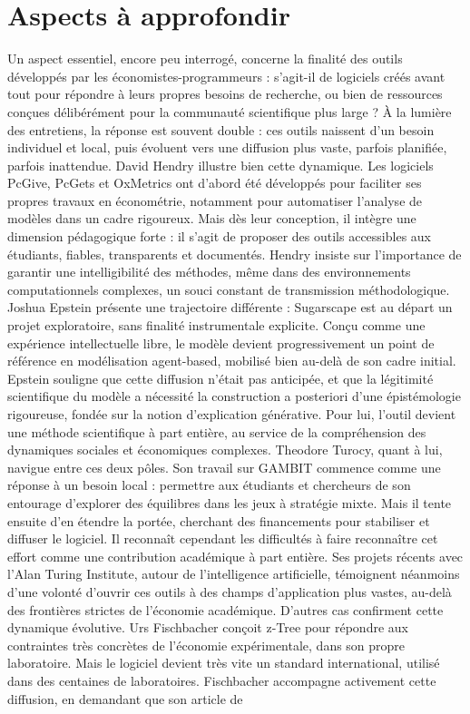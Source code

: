 \section{Aspects à approfondir}

Un aspect essentiel, encore peu interrogé, concerne la finalité des outils développés par les économistes-programmeurs : s’agit-il de logiciels créés avant tout pour répondre à leurs propres besoins de recherche, ou bien de ressources conçues délibérément pour la communauté scientifique plus large ? À la lumière des entretiens, la réponse est souvent double : ces outils naissent d’un besoin individuel et local, puis évoluent vers une diffusion plus vaste, parfois planifiée, parfois inattendue. David Hendry illustre bien cette dynamique. Les logiciels PcGive, PcGets et OxMetrics ont d’abord été développés pour faciliter ses propres travaux en économétrie, notamment pour automatiser l’analyse de modèles dans un cadre rigoureux. Mais dès leur conception, il intègre une dimension pédagogique forte : il s’agit de proposer des outils accessibles aux étudiants, fiables, transparents et documentés. Hendry insiste sur l’importance de garantir une intelligibilité des méthodes, même dans des environnements computationnels complexes, un souci constant de transmission méthodologique. Joshua Epstein présente une trajectoire différente : Sugarscape est au départ un projet exploratoire, sans finalité instrumentale explicite. Conçu comme une expérience intellectuelle libre, le modèle devient progressivement un point de référence en modélisation agent-based, mobilisé bien au-delà de son cadre initial. Epstein souligne que cette diffusion n’était pas anticipée, et que la légitimité scientifique du modèle a nécessité la construction a posteriori d’une épistémologie rigoureuse, fondée sur la notion d’explication générative. Pour lui, l’outil devient une méthode scientifique à part entière, au service de la compréhension des dynamiques sociales et économiques complexes. Theodore Turocy, quant à lui, navigue entre ces deux pôles. Son travail sur GAMBIT commence comme une réponse à un besoin local : permettre aux étudiants et chercheurs de son entourage d’explorer des équilibres dans les jeux à stratégie mixte. Mais il tente ensuite d’en étendre la portée, cherchant des financements pour stabiliser et diffuser le logiciel. Il reconnaît cependant les difficultés à faire reconnaître cet effort comme une contribution académique à part entière. Ses projets récents avec l’Alan Turing Institute, autour de l’intelligence artificielle, témoignent néanmoins d’une volonté d’ouvrir ces outils à des champs d’application plus vastes, au-delà des frontières strictes de l’économie académique. D’autres cas confirment cette dynamique évolutive. Urs Fischbacher conçoit z-Tree pour répondre aux contraintes très concrètes de l’économie expérimentale, dans son propre laboratoire. Mais le logiciel devient très vite un standard international, utilisé dans des centaines de laboratoires. Fischbacher accompagne activement cette diffusion, en demandant que son article de 